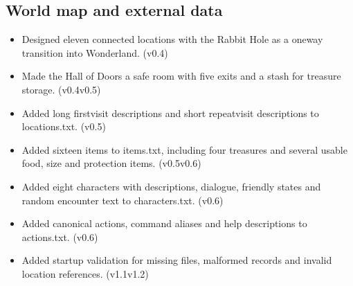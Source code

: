 \documentclass[letterpaper,10pt,english]{sphinxmanual}
\begin{document}
\subsection{World map and external data}
\label{\detokenize{AssignmentFour/main:world-map-and-external-data}}\begin{itemize}
\item {} 
\sphinxAtStartPar
Designed eleven connected locations with the Rabbit Hole as a one\sphinxhyphen{}way transition into Wonderland. (v0.4)

\item {} 
\sphinxAtStartPar
Made the Hall of Doors a safe room with five exits and a stash for treasure storage. (v0.4\sphinxhyphen{}v0.5)

\item {} 
\sphinxAtStartPar
Added long first\sphinxhyphen{}visit descriptions and short repeat\sphinxhyphen{}visit descriptions to locations.txt. (v0.5)

\item {} 
\sphinxAtStartPar
Added sixteen items to items.txt, including four treasures and several usable food, size and protection items. (v0.5\sphinxhyphen{}v0.6)

\item {} 
\sphinxAtStartPar
Added eight characters with descriptions, dialogue, friendly states and random encounter text to characters.txt. (v0.6)

\item {} 
\sphinxAtStartPar
Added canonical actions, command aliases and help descriptions to actions.txt. (v0.6)

\item {} 
\sphinxAtStartPar
Added startup validation for missing files, malformed records and invalid location references. (v1.1\sphinxhyphen{}v1.2)

\end{itemize}
\end{document}
